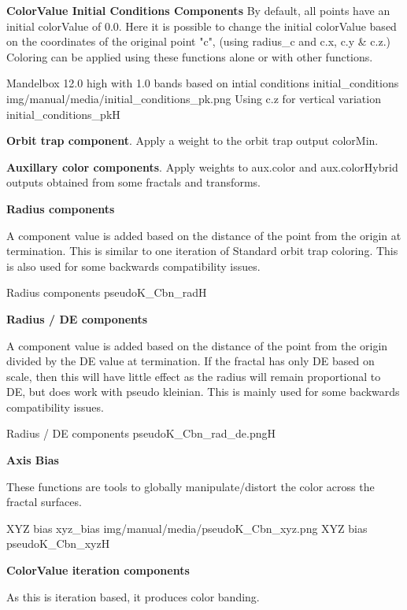 \textbf{ColorValue Initial Conditions Components}
By default, all points have an initial colorValue of 0.0. Here it is possible to change the initial colorValue  based on the coordinates of the original point "c", (using radius\_c and c.x, c.y \& c.z.) Coloring can be applied using these functions alone or with other functions.

{Mandelbox 12.0 high with 1.0 bands based on intial conditions}
{initial_conditions}
{img/manual/media/initial_conditions_pk.png}
{Using c.z for vertical variation}
{initial_conditions_pk}{H}

\textbf{Orbit trap component}. Apply a weight to the orbit trap output colorMin.

\textbf{Auxillary color components}. Apply weights to aux.color and aux.colorHybrid outputs obtained from some fractals and transforms.

\textbf{Radius components} 

A component value is added based on the distance of the point from the origin at termination.
This is similar to one iteration of Standard orbit trap coloring. This is also used for some backwards compatibility issues.

{Radius components}
{pseudoK_Cbn_rad}{H}

\textbf{Radius / DE components}

A component value is added based on the distance of the point from the origin divided by the DE value at termination. If the fractal has only DE based on scale, then this will have little effect as the radius will remain proportional to DE, but does work with pseudo kleinian. This is mainly used for some backwards compatibility issues.

{Radius / DE components}
{pseudoK_Cbn_rad_de.png}{H}

\textbf{Axis Bias}

These functions are tools to globally manipulate/distort the color across the fractal surfaces.
 
{XYZ bias}
{xyz_bias}
{img/manual/media/pseudoK_Cbn_xyz.png}
{XYZ bias}
{pseudoK_Cbn_xyz}{H}

\textbf{ColorValue iteration components}

As this is iteration based, it produces color banding.

